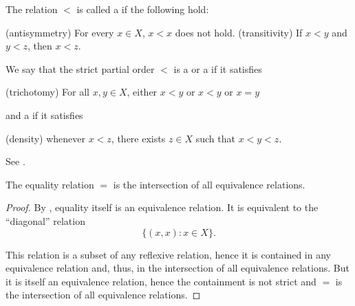 \begin{definition}
\begin{defenum}
    \cite[168]{Enderton1977} The relation \( < \) is called a  if the following hold:
    \begin{defenum}[series=def:order/strict_partial]
      (antisymmetry) For every \( x \in X \), \( x < x \) does not hold.
      (transitivity) If \( x < y \) and \( y < z \), then \( x < z \).
    \end{defenum}

    We say that the strict partial order \( < \) is a  or a  if it satisfies
    \begin{defenum}[resume=def:order/strict_partial]
      (trichotomy) For all \( x, y \in X \), either \( x < y \) or \( x < y \) or \( x = y \)
    \end{defenum}
    and a  if it satisfies
    \begin{defenum}[resume=def:order/strict_partial]
      (density) whenever \( x < z \), there exists \( z \in X \) such that \( x < y < z \).
    \end{defenum}

    See .
  \end{defenum}
\end{definition}

\begin{proposition}\label{thm:equality_is_smallest_equivalence_relation}
  The equality relation \( = \) is the intersection of all equivalence relations.
\end{proposition}
\begin{proof}
  By , equality itself is an equivalence relation. It is equivalent to the \enquote{diagonal} relation
  \begin{equation*}
    \{ (x, x) \colon x \in X \}.
  \end{equation*}

  This relation is a subset of any reflexive relation, hence it is contained in any equivalence relation and, thus, in the intersection of all equivalence relations. But it is itself an equivalence relation, hence the containment is not strict and \( = \) is the intersection of all equivalence relations.
\end{proof}

